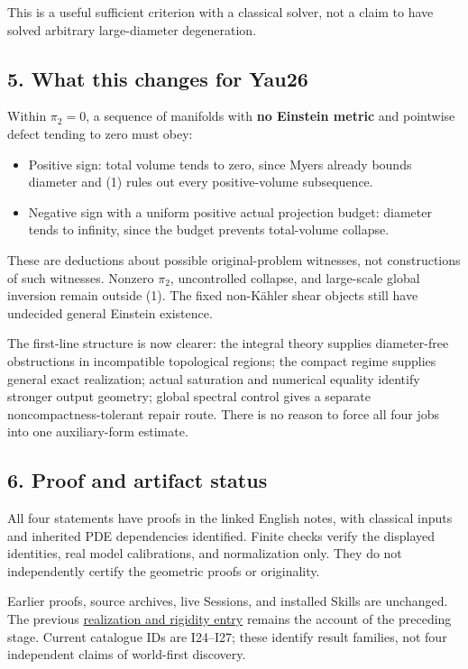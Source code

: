 \documentclass[
  11pt,
]{article}
\providecommand{\tightlist}{%
  \setlength{\itemsep}{0pt}\setlength{\parskip}{0pt}}
\begin{document}
This is a useful sufficient criterion with a classical solver, not a
claim to have solved arbitrary large-diameter degeneration.

\hypertarget{what-this-changes-for-yau26}{%
\subsection{5. What this changes for
Yau26}\label{what-this-changes-for-yau26}}

Within \(\pi_2=0\), a sequence of manifolds with \textbf{no Einstein
metric} and pointwise defect tending to zero must obey:

\begin{itemize}
\tightlist
\item
  Positive sign: total volume tends to zero, since Myers already bounds
  diameter and (1) rules out every positive-volume subsequence.
\item
  Negative sign with a uniform positive actual projection budget:
  diameter tends to infinity, since the budget prevents total-volume
  collapse.
\end{itemize}

These are deductions about possible original-problem witnesses, not
constructions of such witnesses. Nonzero \(\pi_2\), uncontrolled
collapse, and large-scale global inversion remain outside (1). The fixed
non-Kähler shear objects still have undecided general Einstein
existence.

The first-line structure is now clearer: the integral theory supplies
diameter-free obstructions in incompatible topological regions; the
compact regime supplies general exact realization; actual saturation and
numerical equality identify stronger output geometry; global spectral
control gives a separate noncompactness-tolerant repair route. There is
no reason to force all four jobs into one auxiliary-form estimate.

\hypertarget{proof-and-artifact-status}{%
\subsection{6. Proof and artifact
status}\label{proof-and-artifact-status}}

All four statements have proofs in the linked English notes, with
classical inputs and inherited PDE dependencies identified. Finite
checks verify the displayed identities, real model calibrations, and
normalization only. They do not independently certify the geometric
proofs or originality.

Earlier proofs, source archives, live Sessions, and installed Skills are
unchanged. The previous
\href{20260923_realization_and_rigidity.md}{realization and rigidity
entry} remains the account of the preceding stage. Current catalogue IDs
are I24--I27; these identify result families, not four independent
claims of world-first discovery.
\end{document}
